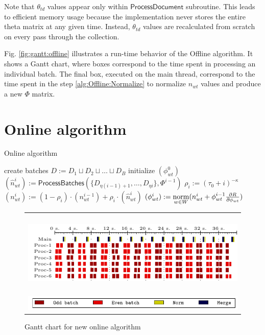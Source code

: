 \documentclass[russian,english]{llncs}
\newcommand{\norm}{\mathop{\rm norm}\limits}
\newcommand{\kw}[1]{\textsf{#1}}
\begin{document}
Note that $\theta_{td}$ values appear only within $\kw{ProcessDocument}$ subroutine.
This leads to efficient memory usage because the implementation never stores the entire theta matrix at any given time.
Instead, $\theta_{td}$ values are recalculated from scratch on every pass through the collection.

Fig. \ref{fig:gantt:offline} illustrates a run-time behavior of the \kw{Offline algorithm}.
It shows a Gantt chart, where boxes correspond to the time spent in processing an individual batch.
The final box, executed on the main thread, correspond to the time spent in the step \ref{alg:Offline:Normalize}
to normalize $n_{wt}$ values and produce a new $\Phi$ matrix.

\section{Online algorithm}
\label{sec:Online}

\SetAlgoSkip{}
\begin{algorithm2e}[t]
	\caption{Online algorithm} %
	\label{alg:Online}
	\BlankLine
	\BlankLine
	create batches $D := D_1 \sqcup D_2 \sqcup \dots \sqcup D_B$\;
	initialize $(\phi^0_{wt})$\;
	 {
		$(\hat n^i_{wt}) := \kw{ProcessBatches}(\{D_{\eta (i - 1) + 1}, \dots, D_{\eta i}\}, \Phi^{i - 1})$\;
		$\rho_i := (\tau_0 + i)^{-\kappa}$\;
		\label{alg:Online:Rho}
		$(n^{i}_{wt}) := (1 - \rho_i) \cdot (n^{i-1}_{wt}) + \rho_i \cdot (\hat n^{i}_{wt})$\;
		\label{alg:Online:Merge}
		$(\phi^{i}_{wt}) := \norm_{w \in W} (n^{i}_{wt} + \phi^{i - 1}_{wt} \frac{\partial R}{\partial \phi_{wt}})$\;
		\label{alg:Online:Normalize}
	}
\end{algorithm2e}
\begin{figure}[t!]
	\centering
	\begin{tabular}{c}
		\includegraphics[height=4cm, width=12cm]{plots/plot_nytimes_non_async_200.pdf} \\
		\includegraphics[scale=1]{plots/plot_legend_async_non_async.pdf}
	\end{tabular}
	\caption{Gantt chart for new online algorithm} \label{fig:gantt:online}
\end{figure}
\end{document}
